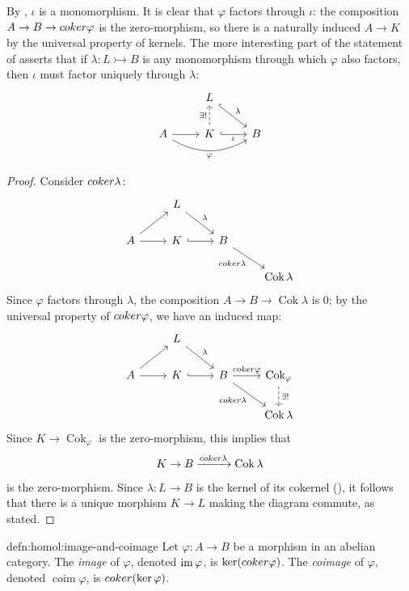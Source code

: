 By , $\iota$ is a monomorphism. It is clear that
$\varphi$ factors through $\iota$: the composition
$A \to B \to coker\varphi$ is the zero-morphism, so there is a
naturally induced $A \to K$ by the universal property of kernels. The
more interesting part of the statement of  asserts
that if $\lambda : L \rightarrowtail B$ is any monomorphism through
which $\varphi$ also factors, then $\iota$ must factor uniquely
through $\lambda$:
\[\begin{tikzcd}
    & L \arrow[dr, hook, "\lambda"] & \\
    A \arrow[r] \arrow[rr, bend right, "\varphi"'] & K \arrow[u,
    dashed, "\exists!"] \arrow[r, hook, "\iota"'] & B
  \end{tikzcd}\]
\begin{proof}
  Consider $coker\lambda$:
  \[\begin{tikzcd}
      & L \arrow[dr, "\lambda"] & \\
      A \arrow[ur] \arrow[r] & K \arrow[r, hook] &
      B \arrow[dr, "\coker\lambda"'] \\
      & & & \operatorname{Cok}\lambda
    \end{tikzcd}\] Since $\varphi$ factors through $\lambda$, the
  composition $A \to B \to \operatorname{Cok}\lambda$ is $0$; by the
  universal property of $coker\varphi$, we have an induced map:
  \[\begin{tikzcd}
      & L \arrow[dr, "\lambda"] & & \\
      A \arrow[ur] \arrow[r] & K \arrow[r, hook] & B \arrow[r,
      "\coker\varphi"] \arrow[dr, "\coker\lambda"'] &
      \operatorname{Cok}_\varphi \arrow[d, dashed, "\exists!"] \\
      & & & \operatorname{Cok}\lambda
    \end{tikzcd}\] Since $K \to \operatorname{Cok}_\varphi$ is the
  zero-morphism, this implies that
  \[
    K \to B \xrightarrow{coker\lambda} \operatorname{Cok}\lambda
  \]
  is the zero-morphism. Since $\lambda : L \to B$ is the kernel of its
  cokernel (), it follows that there is a unique
  morphism $K \to L$ making the diagram commute, as stated.
\end{proof}

\begin{defn}{}{defn:homol:image-and-coimage}
  Let $\varphi : A \to B$ be a morphism in an abelian category. The
  \emph{image} of $\varphi$, denoted $\operatorname{im}\varphi$, is
  $\ker(coker\varphi)$. The \emph{coimage} of $\varphi$, denoted
  $\operatorname{coim}\varphi$, is $coker(\ker\varphi)$.
\end{defn}

